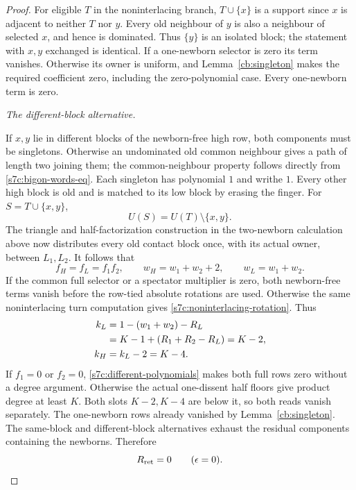 \begin{proof}
For eligible $T$ in the noninterlacing branch, $T\cup\{x\}$ is a
support since $x$ is adjacent to neither $T$ nor $y$.  Every old
neighbour of $y$ is also a neighbour of selected $x$, and hence is
dominated.  Thus $\{y\}$ is an isolated block; the
statement with $x,y$ exchanged is identical.  If a one-newborn
selector is zero its term vanishes.  Otherwise its owner is uniform,
and Lemma~\ref{cb:singleton} makes the required coefficient zero,
including the zero-polynomial case.  Every one-newborn term is zero.

\par\noindent\emph{The different-block alternative.}\par
If $x,y$ lie in different blocks of the newborn-free
high row, both components must be singletons.  Otherwise an undominated
old common neighbour gives a path of length two joining them; the
common-neighbour property follows directly from
\eqref{s7c:bigon-words-eq}.  Each singleton has polynomial $1$ and
writhe $1$.  Every other high block is old and is matched to
its low block by erasing the finger.  For $S=T\cup\{x,y\}$,
\begin{equation}\label{s7c:different-residual}
 U(S)=U(T)\setminus\{x,y\}.
\end{equation}
The triangle and half-factorization construction in
the two-newborn calculation above now distributes every old contact block
once, with its actual owner, between $L_1,L_2$.  It follows that
\begin{equation}\label{s7c:different-polynomials}
 f_H=f_L=f_1f_2,\qquad
 w_H=w_1+w_2+2,\qquad w_L=w_1+w_2.
\end{equation}
If the common full selector or a spectator multiplier is zero, both
newborn-free terms vanish before the row-tied absolute rotations are
used.  Otherwise the same noninterlacing turn computation gives
\eqref{s7c:noninterlacing-rotation}.  Thus
\begin{align}
 k_L
 &=1-(w_1+w_2)-R_L\notag\\
 &=K-1+(R_1+R_2-R_L)=K-2,\label{s7c:different-low-slot}\\
 k_H&=k_L-2=K-4.\label{s7c:different-high-slot}
\end{align}
If $f_1=0$ or $f_2=0$, \eqref{s7c:different-polynomials} makes both
full rows zero without a degree argument.  Otherwise the actual
one-dissent half floors give product degree at least $K$.  Both slots
$K-2,K-4$ are below it, so both reads vanish separately.  The
one-newborn rows already vanished by Lemma~\ref{cb:singleton}.
The same-block and different-block alternatives exhaust the residual
components containing the newborns.  Therefore
\begin{equation}\label{s7c:noninterlacing-return}
 R_{\rm ret}=0\qquad(\epsilon=0).
\end{equation}


\end{proof}
